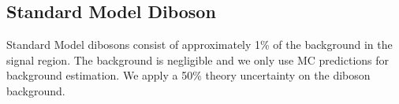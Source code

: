 \subsection{Standard Model Diboson}
\label{sec:Bkg:diboson}

\indent Standard Model dibosons consist of approximately 1\% of the background in the signal region.  The background is negligible and we only use MC predictions for background estimation. We apply a 50\% theory uncertainty on the diboson background. \\